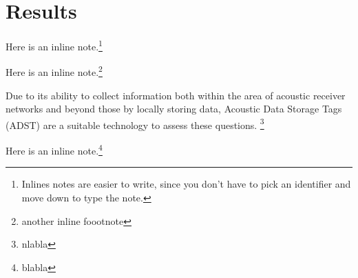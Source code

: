 \documentclass[
  authoryear,
  review,
  3p]{elsarticle}
\begin{document}
\hypertarget{results}{%
\section{Results}\label{results}}

Here is an inline note.\footnote{Inlines notes are easier to write,
  since you don't have to pick an identifier and move down to type the
  note.}

Here is an inline note.\footnote{another inline foootnote}

Due to its ability to collect information both within the area of
acoustic receiver networks and beyond those by locally storing data,
Acoustic Data Storage Tags (ADST) are a suitable technology to assess
these questions. \footnote{nlabla}

Here is an inline note.\footnote{blabla}


  
\end{document}
